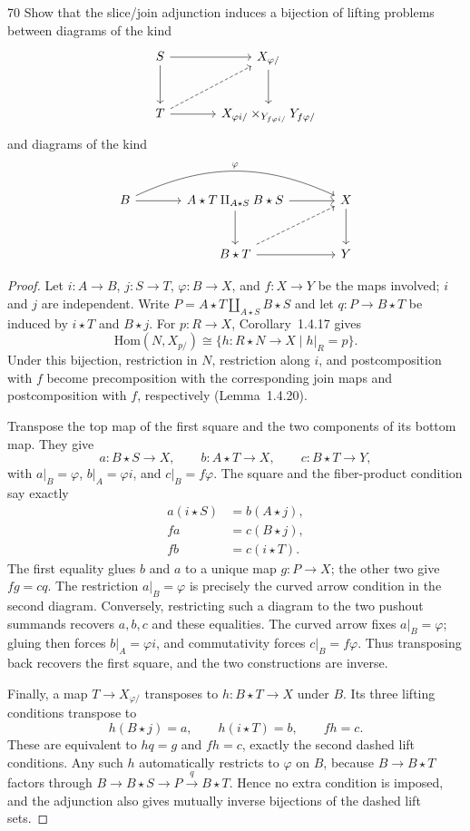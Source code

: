 \begin{exercise}{70}
Show that the slice/join adjunction induces a bijection of lifting problems
between diagrams of the kind
\[
 \begin{tikzcd}[column sep=large,row sep=large]
  S \arrow[r] \arrow[d] & X_{\varphi/} \arrow[d] \\
  T \arrow[r] \arrow[ur,dashed]
    & X_{\varphi i/}\times_{Y_{f\varphi i/}}Y_{f\varphi/}
 \end{tikzcd}
\]
and diagrams of the kind
\[
 \begin{tikzcd}[column sep=large,row sep=large]
  B \arrow[r] \arrow[rr,bend left=25,"\varphi"]
    & A\star T\amalg_{A\star S}B\star S
      \arrow[r] \arrow[d]
    & X \arrow[d] \\
    & B\star T \arrow[r] \arrow[ur,dashed]
    & Y
 \end{tikzcd}
\]

\begin{proof}
Let $i\colon A\to B$, $j\colon S\to T$,
$\varphi\colon B\to X$, and $f\colon X\to Y$ be the
maps involved; $i$ and $j$ are independent.
Write $P=A\star T\amalg_{A\star S}B\star S$ and let
$q\colon P\to B\star T$ be induced by $i\star T$ and
$B\star j$.
For $p\colon R\to X$, Corollary~1.4.17 gives
\[
 \mathrm{Hom}(N,X_{p/})
 \cong\{h\colon R\star N\to X\mid h|_R=p\}.
\]
Under this bijection, restriction in $N$, restriction
along $i$, and postcomposition with $f$ become
precomposition with the corresponding join maps and
postcomposition with $f$, respectively
(Lemma~1.4.20).

Transpose the top map of the first square and the two
components of its bottom map. They give
\[
 a\colon B\star S\to X,\qquad
 b\colon A\star T\to X,\qquad
 c\colon B\star T\to Y,
\]
with $a|_B=\varphi$, $b|_A=\varphi i$, and
$c|_B=f\varphi$.
The square and the fiber-product condition say exactly
\[
\begin{aligned}
 a(i\star S)&=b(A\star j),\\
 fa&=c(B\star j),\\
 fb&=c(i\star T).
\end{aligned}
\]
The first equality glues $b$ and $a$ to a unique map
$g\colon P\to X$; the other two give $fg=cq$.
The restriction $a|_B=\varphi$ is precisely the curved
arrow condition in the second diagram.
Conversely, restricting such a diagram to the two
pushout summands recovers $a,b,c$ and these equalities.
The curved arrow fixes $a|_B=\varphi$; gluing then forces
$b|_A=\varphi i$, and commutativity forces
$c|_B=f\varphi$.
Thus transposing back recovers the first square, and
the two constructions are inverse.

Finally, a map $T\to X_{\varphi/}$ transposes to
$h\colon B\star T\to X$ under $B$.
Its three lifting conditions transpose to
\[
 h(B\star j)=a,\qquad h(i\star T)=b,\qquad fh=c.
\]
These are equivalent to $hq=g$ and $fh=c$, exactly the
second dashed lift conditions.
Any such $h$ automatically restricts to $\varphi$ on
$B$, because $B\to B\star T$ factors through
$B\to B\star S\to P\xrightarrow{q}B\star T$.
Hence no extra condition is imposed, and the adjunction
also gives mutually inverse bijections of the dashed
lift sets.
\end{proof}
\end{exercise}
